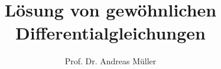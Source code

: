 %
%
%


\beamertemplatenavigationsymbolsempty
\title[DGL]{Lösung von gewöhnlichen Differentialgleichungen}
\author[A.~Müller]{Prof. Dr. Andreas Müller}
\date[]{}

